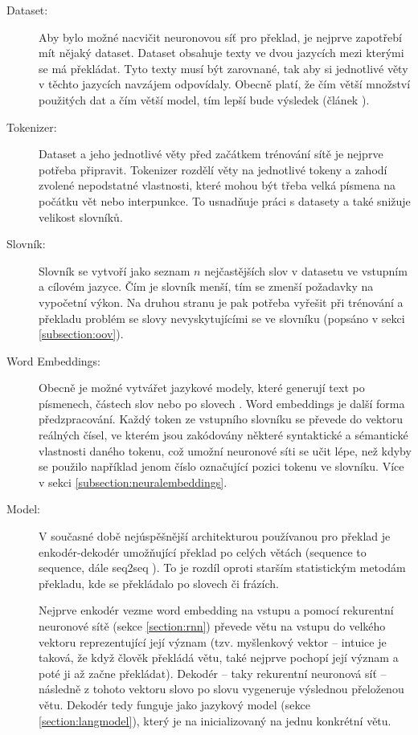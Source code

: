 \begin{description}
  \item[Dataset:] Aby bylo možné nacvičit neuronovou síť pro překlad, je nejprve zapotřebí mít nějaký dataset. Dataset obsahuje texty ve dvou jazycích mezi kterými se má překládat. Tyto texty musí být zarovnané, tak aby si jednotlivé věty v těchto jazycích navzájem odpovídaly. Obecně platí, že čím větší množství použitých dat a čím větší model, tím lepší bude výsledek (článek \cite{googleLimits}).

  \item[Tokenizer:] Dataset a jeho jednotlivé věty před začátkem trénování sítě je nejprve potřeba připravit. Tokenizer rozdělí věty na jednotlivé tokeny a zahodí zvolené nepodstatné vlastnosti, které mohou být třeba velká písmena na počátku vět nebo interpunkce. To usnadňuje práci s datasety a také snižuje velikost slovníků.

  \item[Slovník:] Slovník se vytvoří jako seznam $n$ nejčastějších slov v datasetu ve vstupním a cílovém jazyce. Čím je slovník menší, tím se zmenší požadavky na vypočetní výkon. Na druhou stranu je pak potřeba vyřešit při trénování a překladu problém se slovy nevyskytujícími se ve slovníku (popsáno v sekci \ref{subsection:oov}).

  \item[Word Embeddings:] Obecně je možné vytvářet jazykové modely, které generují text po písmenech, částech slov nebo po slovech \cite{mikolovSubwords}. Word embeddings je další forma předzpracování. Každý token ze vstupního slovníku se převede do vektoru reálných čísel, ve kterém jsou zakódovány některé syntaktické a sémantické vlastnosti daného tokenu, což umožní neuronové síti se učit lépe, než kdyby se použilo například jenom číslo označující pozici tokenu ve slovníku. Více v sekci \ref{subsection:neuralembeddings}.

  \item[Model:] V současné době nejúspěšnější architekturou používanou pro překlad je enkodér-dekodér umožňující překlad po celých větách (sequence to sequence, dále seq2seq \cite{seq2seq}). To je rozdíl oproti starším statistickým metodám překladu, kde se překládalo po slovech či frázích.

      Nejprve enkodér vezme word embedding na vstupu a pomocí rekurentní neuronové sítě (sekce \ref{section:rnn}) převede větu na vstupu do velkého vektoru reprezentující její význam (tzv. myšlenkový vektor -- intuice je taková, že když člověk překládá větu, také nejprve pochopí její význam a poté ji až začne překládat). Dekodér -- taky rekurentní neuronová síť -- následně z tohoto vektoru slovo po slovu vygeneruje výslednou přeloženou větu. Dekodér tedy funguje jako jazykový model (sekce \ref{section:langmodel}), který je na inicializovaný na jednu konkrétní větu.
\end{description}


